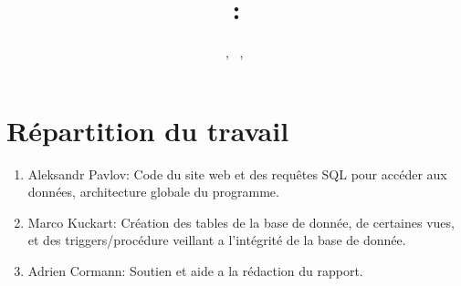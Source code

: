 \documentclass[a4paper, 11pt, oneside]{article}
\title{\courseNb : \intitule}
\author{\PrenomUN~\textsc{\NomUN}, \PrenomDEUX~\textsc{\NomDEUX}, \PrenomTROIS~\textsc{\NomTROIS}}
\date{}
\begin{document}
\maketitle
\newpage
\newpage




\section{Répartition du travail}
\begin{enumerate}
\item Aleksandr Pavlov: Code du site web et des requêtes SQL pour accéder aux données, architecture globale du programme.
\item Marco Kuckart: Création des tables de la base de donnée, de certaines vues, et des triggers/procédure veillant a l'intégrité de la base de donnée.
\item Adrien Cormann: Soutien et aide a la rédaction du rapport.
\end{enumerate}
\end{document}
